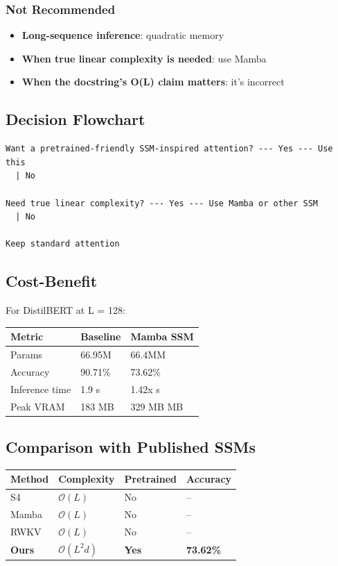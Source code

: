 \subsubsection{Not Recommended}
\begin{itemize}
\item \textbf{Long-sequence inference}: quadratic memory
\item \textbf{When true linear complexity is needed}: use Mamba
\item \textbf{When the docstring's O(L) claim matters}: it's incorrect

\end{itemize}
\subsection{Decision Flowchart}

\begin{lstlisting}
Want a pretrained-friendly SSM-inspired attention? --- Yes --- Use this
  | No
   
Need true linear complexity? --- Yes --- Use Mamba or other SSM
  | No
   
Keep standard attention
\end{lstlisting}

\subsection{Cost-Benefit}

For DistilBERT at L = 128:

\begin{table}[H]
\centering
\small
\begin{tabular}{lll}
\toprule
\textbf{Metric} & \textbf{Baseline} & \textbf{Mamba SSM} \\
\midrule
Params & 66.95M & 66.4MM \\
Accuracy & 90.71\% & 73.62\% \\
Inference time & 1.9 s & 1.42x s \\
Peak VRAM & 183 MB & 329 MB MB \\
\bottomrule
\end{tabular}
\end{table}

\subsection{Comparison with Published SSMs}

\begin{table}[H]
\centering
\small
\begin{tabular}{llll}
\toprule
\textbf{Method} & \textbf{Complexity} & \textbf{Pretrained} & \textbf{Accuracy} \\
\midrule
S4 & $\mathcal{O}(L)$ & No & -- \\
Mamba & $\mathcal{O}(L)$ & No & -- \\
RWKV & $\mathcal{O}(L)$ & No & -- \\
\textbf{Ours} & $\mathcal{O}(L^2 d)$ & \textbf{Yes} & \textbf{73.62\%} \\
\bottomrule
\end{tabular}
\end{table}

